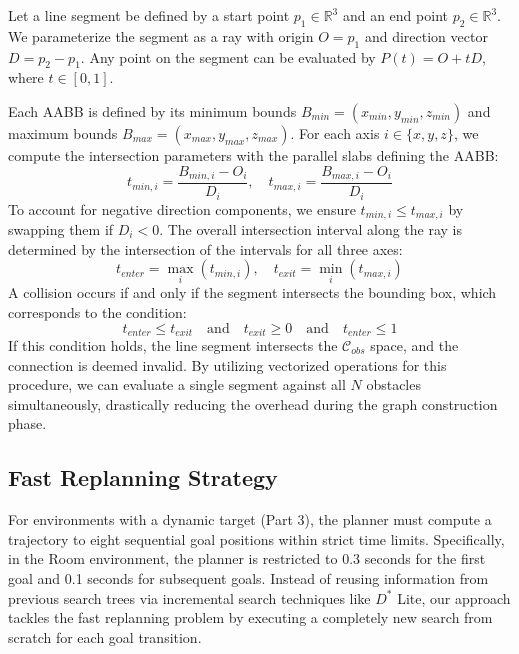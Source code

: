 \documentclass[letterpaper,journal]{IEEEtran}
\begin{document}
Let a line segment be defined by a start point $p_1 \in \mathbb{R}^3$ and an end point $p_2 \in \mathbb{R}^3$. We parameterize the segment as a ray with origin $O = p_1$ and direction vector $D = p_2 - p_1$. Any point on the segment can be evaluated by $P(t) = O + tD$, where $t \in [0, 1]$.

Each AABB is defined by its minimum bounds $B_{min} = (x_{min}, y_{min}, z_{min})$ and maximum bounds $B_{max} = (x_{max}, y_{max}, z_{max})$. For each axis $i \in \{x, y, z\}$, we compute the intersection parameters with the parallel slabs defining the AABB:
\begin{equation}
    t_{min, i} = \frac{B_{min, i} - O_i}{D_i}, \quad t_{max, i} = \frac{B_{max, i} - O_i}{D_i}
\end{equation}
To account for negative direction components, we ensure $t_{min, i} \le t_{max, i}$ by swapping them if $D_i < 0$. The overall intersection interval along the ray is determined by the intersection of the intervals for all three axes:
\begin{equation}
    t_{enter} = \max_i (t_{min, i}), \quad t_{exit} = \min_i (t_{max, i})
\end{equation}
A collision occurs if and only if the segment intersects the bounding box, which corresponds to the condition:
\begin{equation}
    t_{enter} \le t_{exit} \quad \text{and} \quad t_{exit} \ge 0 \quad \text{and} \quad t_{enter} \le 1
\end{equation}
If this condition holds, the line segment intersects the $\mathcal{C}_{obs}$ space, and the connection is deemed invalid. By utilizing vectorized operations for this procedure, we can evaluate a single segment against all $N$ obstacles simultaneously, drastically reducing the overhead during the graph construction phase.

\subsection{Fast Replanning Strategy}
For environments with a dynamic target (Part 3), the planner must compute a trajectory to eight sequential goal positions within strict time limits. Specifically, in the Room environment, the planner is restricted to 0.3 seconds for the first goal and 0.1 seconds for subsequent goals. Instead of reusing information from previous search trees via incremental search techniques like $D^*$ Lite, our approach tackles the fast replanning problem by executing a completely new search from scratch for each goal transition.
\end{document}

